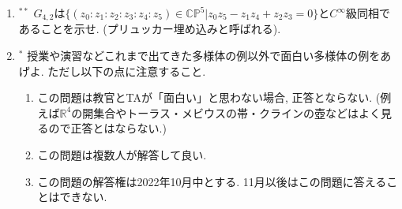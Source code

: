 \documentclass[dvipdfmx,a4paper,11pt]{article}
\newcommand{\R}{\mathbb{R}}
\newcommand{\C}{\mathbb{C}}
\theoremstyle{definition}
\begin{document}
\begin{enumerate}[label=\textbf{問}1.\arabic*]
\item $^{**}$ $G_{4,2}$は$\{ (z_0:z_1:z_2:z_3:z_4:z_5) \in  \C\mathbb{P}^{5}| z_0z_5 - z_1z_4 + z_2z_3 =0\}$と$C^{\infty}$級同相であることを示せ. (プリュッカー埋め込みと呼ばれる).



\item$^{*}$ 授業や演習などこれまで出てきた多様体の例以外で面白い多様体の例をあげよ. ただし以下の点に注意すること.
	\begin{enumerate}
	\item この問題は教官とTAが「面白い」と思わない場合, 正答とならない. (例えば$\R^4$の開集合やトーラス・メビウスの帯・クラインの壺などはよく見るので正答とはならない.)
	\item この問題は複数人が解答して良い.
	\item この問題の解答権は2022年10月中とする. 11月以後はこの問題に答えることはできない. 
	\end{enumerate}

	



\begin{comment}
$SO(2, \R) $が$S^1$と$C^{\infty}$級微分同相であることをしめせ. 
\item  
$$
SU(2, \C) = \left\{\left(\begin{array}{cc} \alpha& - \overline{\beta}\\ \beta&\overline{\alpha} \end{array}\right) |
\alpha, \beta \in \C, |\alpha|^2 + |\beta|^2 =1 \right\}$$
とおく. 次の問いに答えよ.
	\begin{enumerate}
	\item $SU(2, \C)$は$S^3$と$C^{\infty}$級微分同相であること示せ. 
	\item $$
	\end{enumerate}
\end{comment}

\end{enumerate}
 
\end{document}
